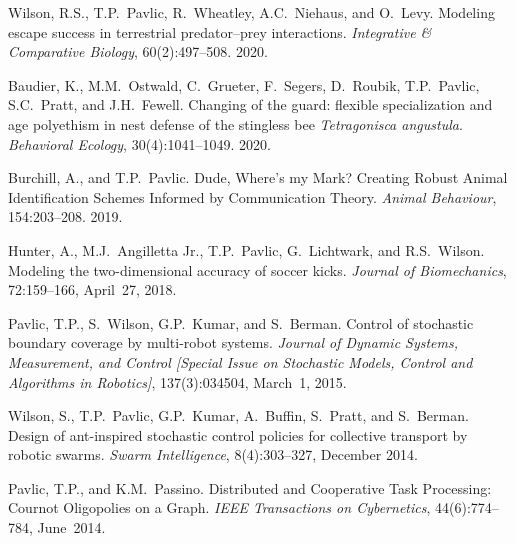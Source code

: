 \documentclass[10pt]{article}
\begin{document}
\begin{bibenum}
    \item Wilson, R.S., T.P.~Pavlic, R.~Wheatley, A.C.~Niehaus, and
        O.~Levy. Modeling escape success in terrestrial predator--prey
        interactions.
        \emph{Integrative \& Comparative Biology}, 60(2):497--508. 2020.

    \item Baudier, K., M.M.~Ostwald, C.~Grueter, F.~Segers, D.~Roubik,
        T.P.~Pavlic, S.C.~Pratt, and J.H.~Fewell. Changing of the guard:
        flexible specialization and age polyethism in nest defense of
        the stingless bee \emph{Tetragonisca angustula}.
        \emph{Behavioral Ecology}, 30(4):1041--1049. 2020.

    \item Burchill, A., and T.P.~Pavlic. Dude, Where's my Mark? Creating
        Robust Animal Identification Schemes Informed by Communication
        Theory. \emph{Animal Behaviour}, 154:203--208. 2019.

    \item Hunter, A., M.J.~Angilletta Jr., T.P.~Pavlic, G.~Lichtwark,
        and R.S.~Wilson. Modeling the two-dimensional accuracy of soccer
        kicks. \emph{Journal of Biomechanics}, 72:159--166, April~27,
        2018. 

    \item Pavlic, T.P., S.~Wilson, G.P.~Kumar, and S.~Berman. Control of
        stochastic boundary coverage by multi-robot systems.
        \emph{Journal of Dynamic Systems, Measurement, and Control
        [Special Issue on Stochastic Models, Control and Algorithms
        in Robotics]}, 137(3):034504, March~1, 2015.

    \item Wilson, S., T.P.~Pavlic, G.P.~Kumar, A.~Buffin, S.~Pratt, and
        S.~Berman. Design of ant-inspired stochastic control policies
        for collective transport by robotic swarms. \emph{Swarm
        Intelligence}, 8(4):303--327, December 2014.

    \item Pavlic, T.P., and K.M.~Passino. Distributed and Cooperative
        Task Processing: Cournot Oligopolies on a Graph.
        \emph{IEEE Transactions on Cybernetics}, 44(6):774--784, June~2014.


\end{bibenum}
\end{document}
